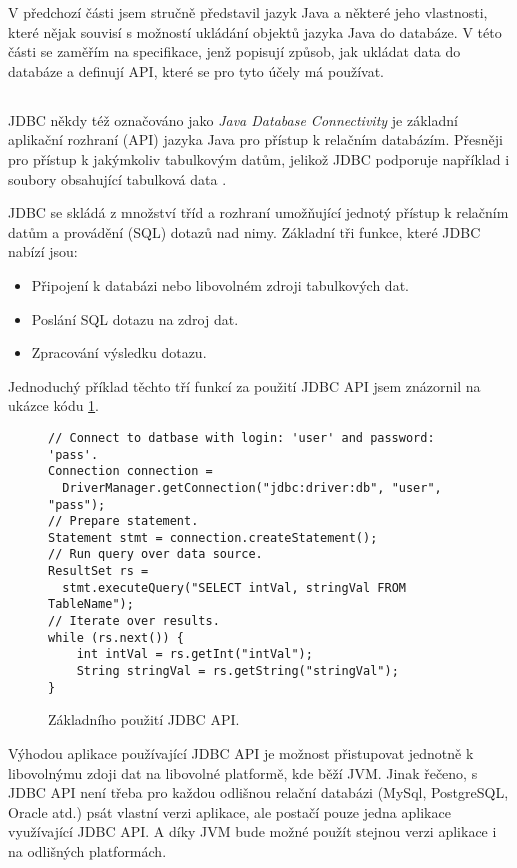 V předchozí části jsem stručně představil jazyk Java a některé jeho vlastnosti, které nějak souvisí s možností ukládání objektů jazyka Java do databáze. V této části se zaměřím na specifikace, jenž popisují způsob, jak ukládat data do databáze a definují API, které se pro tyto účely má používat. 

\subsection{\jdbc}
JDBC někdy též označováno jako \textit{Java Database Connectivity} je základní aplikační rozhraní (API) jazyka Java pro přístup k relačním databázím. Přesněji pro přístup k jakýmkoliv tabulkovým datům, jelikož JDBC podporuje například i soubory obsahující tabulková data \cite{fisher:jdbc,donahue:jdpb}.

JDBC se skládá z množství tříd a rozhraní umožňující jednotý přístup k relačním datům a provádění (SQL) dotazů nad nimy. Základní tři funkce, které JDBC nabízí jsou:
\begin{itemize}
  \item Připojení k databázi nebo libovolném zdroji tabulkových dat.
  \item Poslání SQL dotazu na zdroj dat.
  \item Zpracování výsledku dotazu.
\end{itemize}

Jednoduchý příklad těchto tří funkcí za použití JDBC API jsem znázornil na ukázce kódu \ref{jdbc:conn}.
\begin{figure}
\begin{lstlisting}
// Connect to datbase with login: 'user' and password: 'pass'.
Connection connection = 
  DriverManager.getConnection("jdbc:driver:db", "user", "pass");
// Prepare statement.
Statement stmt = connection.createStatement();
// Run query over data source.
ResultSet rs = 
  stmt.executeQuery("SELECT intVal, stringVal FROM TableName");
// Iterate over results.
while (rs.next()) {
    int intVal = rs.getInt("intVal");
    String stringVal = rs.getString("stringVal");
}
\end{lstlisting}
\caption{Základního použití JDBC API.}
\label{jdbc:conn}
\end{figure}


Výhodou aplikace používající JDBC API je možnost přistupovat jednotně k libovolnýmu zdoji dat na libovolné platformě, kde běží JVM. Jinak řečeno, s JDBC API není třeba pro každou odlišnou relační databázi (MySql, PostgreSQL, Oracle atd.) psát vlastní verzi aplikace, ale postačí pouze jedna aplikace využívající JDBC API. A díky JVM bude možné použít stejnou verzi aplikace i na odlišných platformách.
